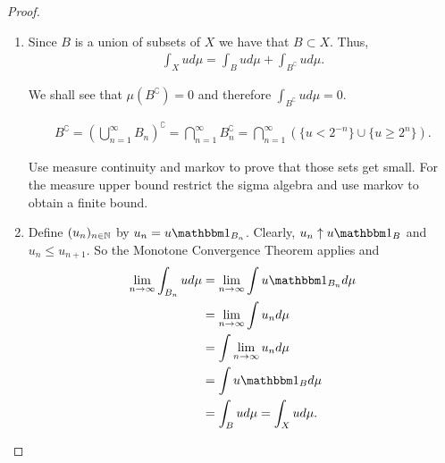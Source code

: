 \begin{proof}$ $\newline
	\begin{enumerate}
		\item Since $B$ is a union of subsets of $X$ we have that $B \subset X$. Thus,
		\begin{align*}
			\int_X u d\mu
			= \int_B ud\mu + \int_{B^\complement} u d\mu.
		\end{align*}
		
		We shall see that $\mu(B^\complement) = 0$ and therefore $\int_{B^\complement} u d\mu = 0$.
		
		\begin{align*}
			B^\complement
			= \left(\bigcup_{n=1}^\infty B_n\right)^\complement
			= \bigcap_{n=1}^\infty B_n^\complement = \bigcap_{n=1}^\infty \left( \{u < 2^{-n}\} \cup \{u \geq 2^n\}\right).
		\end{align*}
		
		Use measure continuity and markov to prove that those sets get small. For the measure upper bound restrict the sigma algebra and use markov to obtain a finite bound.
		
		\item Define $(u_n)_{n\in\mathbb{N}}$ by $u_n = u \ind_{B_n}$. Clearly, $u_n \uparrow u \ind_B$ and $u_n \leq u_{n+1}$. So the Monotone Convergence Theorem applies and
		\begin{align*}
			\lim_{n \to \infty} \int_{B_n} u d\mu
			&= \lim_{n \to \infty} \int u \ind_{B_n} d \mu \\
			&= \lim_{n \to \infty} \int u_n d\mu\\
			&= \int \lim_{n \to \infty} u_n d\mu\\
			&= \int u \ind_B d\mu\\
			&= \int_B ud\mu = \int_X u d\mu.
		\end{align*}
		

\end{enumerate}
\end{proof}
